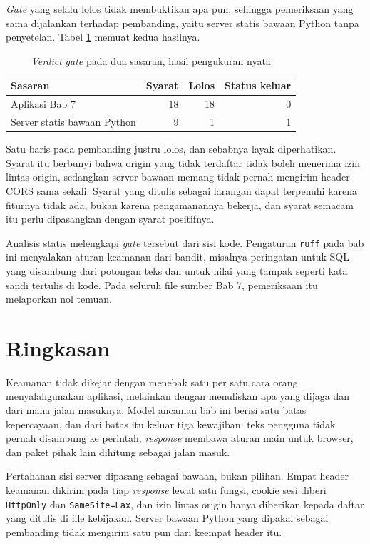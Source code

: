 \textit{Gate} yang selalu lolos tidak membuktikan apa pun, sehingga pemeriksaan
yang sama dijalankan terhadap pembanding, yaitu server statis bawaan Python
tanpa penyetelan. Tabel \ref{tab:gate-banding} memuat kedua hasilnya.

\begin{table}[!htb]
  \centering
  \caption{\textit{Verdict} \textit{gate} pada dua sasaran, hasil pengukuran nyata}
  \label{tab:gate-banding}
  \begin{tabularx}{\textwidth}{Xrrr}
    \hline
    \textbf{Sasaran} & \textbf{Syarat} & \textbf{Lolos} & \textbf{Status keluar} \\
    \hline
    Aplikasi Bab 7 & 18 & 18 & 0 \\
    \hline
    Server statis bawaan Python & 9 & 1 & 1 \\
    \hline
  \end{tabularx}
\end{table}

Satu baris pada pembanding justru lolos, dan sebabnya layak diperhatikan.
Syarat itu berbunyi bahwa origin yang tidak terdaftar tidak boleh menerima
izin lintas origin, sedangkan server bawaan memang tidak pernah mengirim
header CORS sama sekali. Syarat yang ditulis sebagai larangan dapat terpenuhi
karena fiturnya tidak ada, bukan karena pengamanannya bekerja, dan syarat
semacam itu perlu dipasangkan dengan syarat positifnya.

Analisis statis melengkapi \textit{gate} tersebut dari sisi kode. Pengaturan
\texttt{ruff} pada bab ini menyalakan aturan keamanan dari bandit, misalnya
peringatan untuk SQL yang disambung dari potongan teks dan untuk nilai yang
tampak seperti kata sandi tertulis di kode. Pada seluruh file sumber Bab 7,
pemeriksaan itu melaporkan nol temuan.

\section{Ringkasan}

Keamanan tidak dikejar dengan menebak satu per satu cara orang menyalahgunakan
aplikasi, melainkan dengan menuliskan apa yang dijaga dan dari mana jalan
masuknya. Model ancaman bab ini berisi satu batas kepercayaan, dan dari batas
itu keluar tiga kewajiban: teks pengguna tidak pernah disambung ke perintah,
\textit{response} membawa aturan main untuk browser, dan paket pihak lain
dihitung sebagai jalan masuk.

Pertahanan sisi server dipasang sebagai bawaan, bukan pilihan. Empat header
keamanan dikirim pada tiap \textit{response} lewat satu fungsi, cookie sesi
diberi \texttt{HttpOnly} dan \texttt{SameSite=Lax}, dan izin lintas origin
hanya diberikan kepada daftar yang ditulis di file kebijakan. Server bawaan
Python yang dipakai sebagai pembanding tidak mengirim satu pun dari keempat
header itu.

